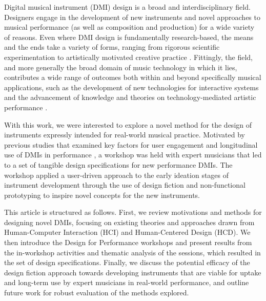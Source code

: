 \documentclass[letterpaper, 12pt]{article}
\begin{document}


Digital musical instrument (DMI) design is a broad and interdisciplinary field. Designers engage in the development of new instruments and novel approaches to musical performance (as well as composition and production) for a wide variety of reasons. Even where DMI design is fundamentally research-based, the means and the ends take a variety of forms, ranging from rigorous scientific experimentation to artistically motivated creative practice \citep{Gurevich2016}. Fittingly, the field, and more generally the broad domain of music technology in which it lies, contributes a wide range of outcomes both within and beyond specifically musical applications, such as the development of new technologies for interactive systems \citep{malloch2018generalized} and the advancement of knowledge and theories on technology-mediated artistic performance \citep{Tahlroglu2020}. 

With this work, we were interested to explore a novel method for the design of instruments expressly intended for real-world musical practice. Motivated by previous studies that examined key factors for user engagement \citep{OBrien2008} and longitudinal use of DMIs in performance \citep{Sullivan2019,Wallis2013}, a workshop was held with expert musicians that led to a set of tangible design specifications for new performance DMIs. The workshop applied a user-driven approach to the early ideation stages of instrument development through the use of design fiction \citep{Blythe2014} and non-functional prototyping \citep{Pigrem2018} to inspire novel concepts for the new instruments. 

This article is structured as follows. First, we review motivations and methods for designing novel DMIs, focusing on existing theories and approaches drawn from Human-Computer Interaction (HCI) and Human-Centered Design (HCD). We then introduce the Design for Performance workshops and present results from the in-workshop activities and thematic analysis of the sessions, which resulted in the set of design specifications. Finally, we discuss the potential efficacy of the design fiction approach towards developing instruments that are viable for uptake and long-term use by expert musicians in real-world performance, and outline future work for robust evaluation of the methods explored.
\end{document}
